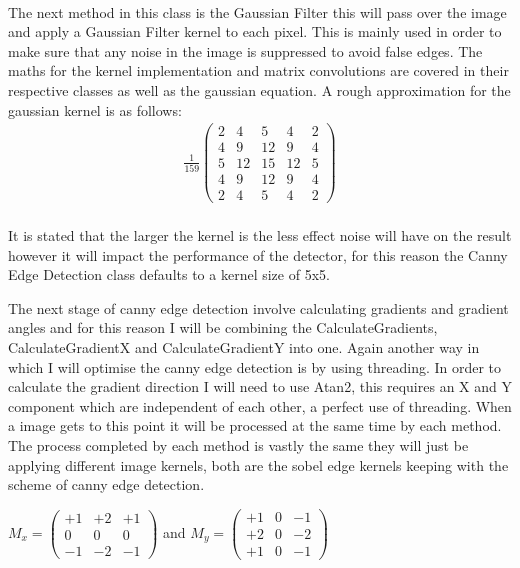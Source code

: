 \begin{FlushLeft}
    \\ \bk

    The next method in this class is the Gaussian Filter this will pass over the image and apply a Gaussian Filter kernel to each pixel. This is mainly used in order to make sure that any noise in the image is suppressed to avoid false edges. The maths for the kernel implementation and matrix convolutions are covered in their respective classes as well as the gaussian equation. A rough approximation for the gaussian kernel is as follows:\\

    \begin{gather*}
        \frac{1}{159}\begin{pmatrix}
            2 & 4 & 5 & 4 & 2 \\
            4 & 9 & 12 & 9 & 4 \\
            5 & 12 & 15 & 12 & 5 \\
            4 & 9 & 12 & 9 & 4 \\
            2 & 4 & 5 & 4 & 2
        \end{pmatrix}
    \end{gather*} \\

    It is stated that the larger the kernel is the less effect noise will have on the result however it will impact the performance of the detector, for this reason the Canny Edge Detection class defaults to a kernel size of 5x5. \\ \bk

    The next stage of canny edge detection involve calculating gradients and gradient angles and for this reason I will be combining the CalculateGradients, CalculateGradientX and CalculateGradientY into one. Again another way in which I will optimise the canny edge detection is by using threading. In order to calculate the gradient direction I will need to use Atan2, this requires an X and Y component which are independent of each other, a perfect use of threading. When a image gets to this point it will be processed at the same time by each method. The process completed by each method is vastly the same they will just be applying different image kernels, both are the sobel edge kernels keeping with the scheme of canny edge detection. \\ \bk   

    \begin{center}
        
        $
        M_x = \begin{pmatrix}
            +1 & +2 & +1 \\
            0 & 0 & 0 \\
            -1 & -2 & -1
        \end{pmatrix}
    $ 
    and $ M_y = \begin{pmatrix}
            +1 & 0 & -1 \\
            +2 & 0 & -2 \\
            +1 & 0 & -1 
        \end{pmatrix}
    $
    \end{center} \\
 

\end{FlushLeft}
